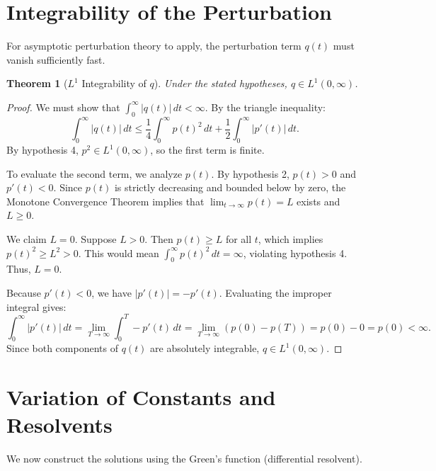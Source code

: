 \documentclass[10pt,reqno]{amsart}
\newtheorem{theorem}{Theorem}
\theoremstyle{definition}
\begin{document}
	\section{Integrability of the Perturbation}
	
	For asymptotic perturbation theory to apply, the perturbation term $q(t)$ must vanish sufficiently fast. 
	
	\begin{theorem}[$L^1$ Integrability of $q$]
		Under the stated hypotheses, $q \in L^1(0, \infty)$.
	\end{theorem}
	
	\begin{proof}
		We must show that $\int_0^\infty |q(t)| \, dt < \infty$. By the triangle inequality:
		\[ \int_0^\infty |q(t)| \, dt \le \frac{1}{4}\int_0^\infty p(t)^2 \, dt + \frac{1}{2}\int_0^\infty |p'(t)| \, dt. \]
		By hypothesis 4, $p^2 \in L^1(0, \infty)$, so the first term is finite. 
		
		To evaluate the second term, we analyze $p(t)$. By hypothesis 2, $p(t) > 0$ and $p'(t) < 0$. Since $p(t)$ is strictly decreasing and bounded below by zero, the Monotone Convergence Theorem implies that $\lim_{t \to \infty} p(t) = L$ exists and $L \ge 0$. 
		
		We claim $L = 0$. Suppose $L > 0$. Then $p(t) \ge L$ for all $t$, which implies $p(t)^2 \ge L^2 > 0$. This would mean $\int_0^\infty p(t)^2 \, dt = \infty$, violating hypothesis 4. Thus, $L = 0$.
		
		Because $p'(t) < 0$, we have $|p'(t)| = -p'(t)$. Evaluating the improper integral gives:
		\[ \int_0^\infty |p'(t)| \, dt = \lim_{T \to \infty} \int_0^T -p'(t) \, dt = \lim_{T \to \infty} (p(0) - p(T)) = p(0) - 0 = p(0) < \infty. \]
		Since both components of $q(t)$ are absolutely integrable, $q \in L^1(0, \infty)$.
	\end{proof}
	
	\section{Variation of Constants and Resolvents}
	
	We now construct the solutions using the Green's function (differential resolvent).
	
\end{document}
